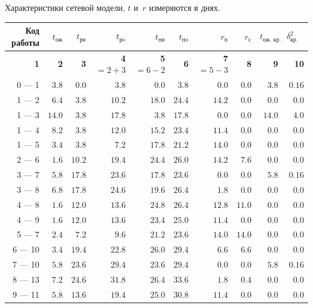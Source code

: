\begin{dsmalltable}{Характеристики сетевой модели, $t$ и~$r$ измеряются в днях.}
	\begin{tabular}{|r|r||r|r||r|r||r|r||r|r|}
		\hline
			Код работы &  $ t_{\text{ож}} $  &
				 $ t_{\text{рн}} $  & $ t_{\text{рo}} $  &
					 $ t_{\text{пн}} $  & $ t_{\text{пo}} $  &
						$ r_{\text{п}} $ & $ r_{\text{с}} $ & 
							$ t_{\text{ож. кр. пути}} $ & $ \delta^2_{\text{кр. пути}}$ \\ 
		\hline
			\textbf{1} &   \textbf{2} & 
				\textbf{3} & \textbf{4} $= 2 + 3$ & 
					\textbf{5} $= 6 - 2$ & \textbf{6} & 
						\textbf{7} $= 5 - 3$ & \textbf{8} & 
							\textbf{9} &  \textbf{10} \\
		\hline 
			\hline  0 --- 1 &$ 3.8$&$ 0.0$&$ 3.8$&$ 0.0$&$ 3.8$&$ 0.0$&$ 0.0 $&$ 3.8$&$0.16$\\
			\hline  1 --- 2 &$ 6.4$&$ 3.8$&$10.2$&$18.0$&$24.4$&$14.2$&$ 0.0 $&$ 0.0$&$0.0 $\\
			\hline  1 --- 3 &$14.0$&$ 3.8$&$17.8$&$ 3.8$&$17.8$&$ 0.0$&$ 0.0 $&$14.0$&$4.0 $\\
			\hline  1 --- 4 &$ 8.2$&$ 3.8$&$12.0$&$15.2$&$23.4$&$11.4$&$ 0.0 $&$ 0.0$&$0.0 $\\
			\hline  1 --- 5 &$ 3.4$&$ 3.8$&$ 7.2$&$17.8$&$21.2$&$14.0$&$ 0.0 $&$ 0.0$&$0.0 $\\
			\hline  2 --- 6 &$ 1.6$&$10.2$&$19.4$&$24.4$&$26.0$&$14.2$&$ 7.6 $&$ 0.0$&$0.0 $\\
			\hline  3 --- 7 &$ 5.8$&$17.8$&$23.6$&$17.8$&$23.6$&$ 0.0$&$ 0.0 $&$ 5.8$&$0.16$\\
			\hline  3 --- 8 &$ 6.8$&$17.8$&$24.6$&$19.6$&$26.4$&$ 1.8$&$ 0.0 $&$ 0.0$&$0.0 $\\
			\hline  4 --- 8 &$ 1.6$&$12.0$&$13.6$&$24.8$&$26.4$&$12.8$&$11.0 $&$ 0.0$&$0.0 $\\
			\hline  4 --- 9 &$ 1.6$&$12.0$&$13.6$&$23.4$&$25.0$&$11.4$&$ 0.0 $&$ 0.0$&$0.0 $\\
			\hline  5 --- 7 &$ 2.4$&$ 7.2$&$ 9.6$&$21.2$&$23.6$&$14.0$&$14.0 $&$ 0.0$&$0.0 $\\
			\hline  6 --- 10&$ 3.4$&$19.4$&$22.8$&$26.0$&$29.4$&$ 6.6$&$ 6.6 $&$ 0.0$&$0.0 $\\
			\hline  7 --- 10&$ 5.8$&$23.6$&$29.4$&$23.6$&$29.4$&$ 0.0$&$ 0.0 $&$ 5.8$&$0.16$\\
			\hline  8 --- 13&$ 7.2$&$24.6$&$31.8$&$26.4$&$33.6$&$ 1.8$&$ 0.4 $&$ 0.0$&$0.0 $\\
			\hline  9 --- 11&$ 5.8$&$13.6$&$19.4$&$25.0$&$30.8$&$11.4$&$ 0.0 $&$ 0.0$&$0.0 $\\

\end{tabular}
\end{dsmalltable}
